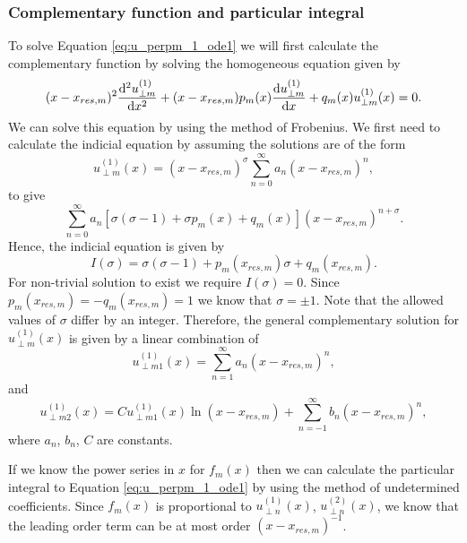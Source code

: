 \subsubsection{Complementary function and particular integral}

To solve Equation \eqref{eq:u_perpm_1_ode1} we will first calculate the complementary function by solving the homogeneous equation given by
\begin{equation}
    \label{eq:u_perpm_1_ode_homogenous}
    (x-x_{res,m})^2\dv[2]{u_{\perp m}^{(1)}}{x}+(x-x_{res,m})p_m(x)\dv{u_{\perp m}^{(1)}}{x}+q_m(x)u_{\perp m}^{(1)}(x) = 0.
\end{equation}
We can solve this equation by using the method of Frobenius. We first need to calculate the indicial equation by assuming the solutions are of the form
\[u_{\perp m}^{(1)}(x) = (x-x_{res,m})^\sigma\sum_{n=0}^\infty a_n(x-x_{res,m})^n,\]
to give
\[\sum_{n=0}^\infty a_n[\sigma(\sigma-1)+\sigma p_m(x) + q_m(x)](x-x_{res,m})^{n+\sigma}.\]
Hence, the indicial equation is given by
\begin{equation}
    I(\sigma) = \sigma(\sigma-1) + p_m(x_{res,m})\sigma + q_m(x_{res,m}).
\end{equation}
For non-trivial solution to exist we require $I(\sigma)=0$. Since $p_m(x_{res,m})=-q_m(x_{res,m})=1$ we know that $\sigma =\pm1$. Note that the allowed values of $\sigma$ differ by an integer. Therefore, the general complementary solution for $u_{\perp m}^{(1)}(x)$ is given by a linear combination of
\begin{equation}
    u_{\perp m 1}^{(1)}(x) = \sum_{n=1}^\infty a_n (x-x_{res,m})^n,
\end{equation}
and
\begin{equation}
    u_{\perp m 2}^{(1)}(x) = Cu_{\perp m 1}^{(1)}(x) \ln(x-x_{res,m})+ \sum_{n=-1}^\infty b_n(x-x_{res,m})^n,
\end{equation}
where $a_n$, $b_n$, $C$ are constants.

If we know the power series in $x$ for $f_m(x)$ then we can calculate the particular integral to Equation \eqref{eq:u_perpm_1_ode1} by using the method of undetermined coefficients. Since $f_m(x)$ is proportional to $u_{\perp n}^{(1)}(x)$, $u_{\perp n}^{(2)}(x)$, we know that the leading order term can be at most order $(x-x_{res,m})^{-1}$.


